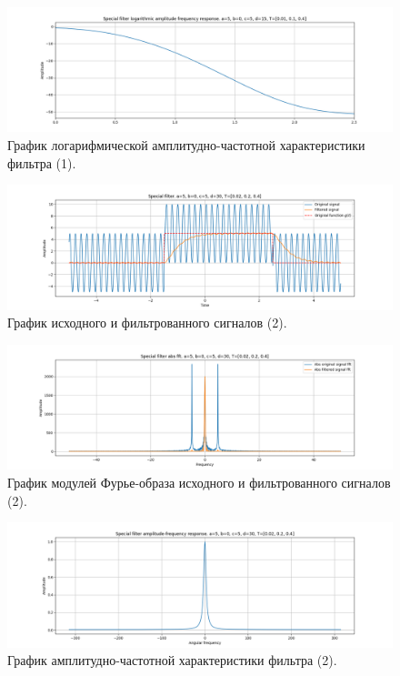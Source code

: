 \documentclass[a4paper, 12pt]{article}
\begin{document}
    \begin{figure}[H]
        \centering
        \includegraphics[scale=0.4]{1_fl2_lafr.png}
        \captionsetup{skip=0pt}
        \caption{График логарифмической амплитудно-частотной характеристики фильтра (1).}
        \label{fig:filinlafr21}
    \end{figure}
    \begin{figure}[H]
        \centering
        \includegraphics[scale=0.4]{2_fl2.png}
        \captionsetup{skip=0pt}
        \caption{График исходного и фильтрованного сигналов (2).}
        \label{fig:filin22}
    \end{figure}
    \begin{figure}[H]
        \centering
        \includegraphics[scale=0.4]{2_fl2_abs.png}
        \captionsetup{skip=0pt}
        \caption{График модулей Фурье-образа исходного и фильтрованного сигналов (2).}
        \label{fig:filinabs22}
    \end{figure}
    \begin{figure}[H]
        \centering
        \includegraphics[scale=0.4]{2_fl2_afr.png}
        \captionsetup{skip=0pt}
        \caption{График амплитудно-частотной характеристики фильтра (2).}
        \label{fig:filinafr22}
    \end{figure}
\end{document}
